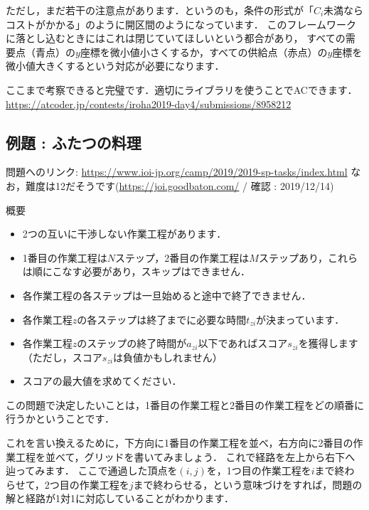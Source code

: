 \documentclass[13pt]{jarticle}
\begin{document}
ただし，まだ若干の注意点があります．というのも，条件の形式が「$C_i$未満ならコストがかかる」のように開区間のようになっています．
このフレームワークに落とし込むときにはこれは閉じていてほしいという都合があり，
すべての需要点（青点）の$y$座標を微小値小さくするか，すべての供給点（赤点）の$y$座標を微小値大きくするという対応が必要になります．

ここまで考察できると完璧です．適切にライブラリを使うことでACできます．
\url{https://atcoder.jp/contests/iroha2019-day4/submissions/8958212}


\subsection{例題 : ふたつの料理}
問題へのリンク: \url{https://www.ioi-jp.org/camp/2019/2019-sp-tasks/index.html}
なお，難度は12だそうです(\url{https://joi.goodbaton.com/} / 確認 : 2019/12/14)

概要
\begin{itemize}
\item 2つの互いに干渉しない作業工程があります．
\item 1番目の作業工程は$N$ステップ，2番目の作業工程は$M$ステップあり，これらは順にこなす必要があり，スキップはできません．
\item 各作業工程の各ステップは一旦始めると途中で終了できません．
\item 各作業工程$z$の各ステップは終了までに必要な時間$t_{zi}$が決まっています．
\item 各作業工程$z$のステップの終了時間が$a_{zi}$以下であればスコア$s_{zi}$を獲得します（ただし，スコア$s_{zi}$は負値かもしれません）
\item スコアの最大値を求めてください．
\end{itemize}


この問題で決定したいことは，1番目の作業工程と2番目の作業工程をどの順番に行うかということです．

これを言い換えるために，下方向に1番目の作業工程を並べ，右方向に2番目の作業工程を並べて，グリッドを書いてみましょう．
これで経路を左上から右下へ辿ってみます．
ここで通過した頂点を$(i,j)$を，1つ目の作業工程を$i$まで終わらせて，2つ目の作業工程を$j$まで終わらせる，という意味づけをすれば，問題の解と経路が1対1に対応していることがわかります．
\end{document}
